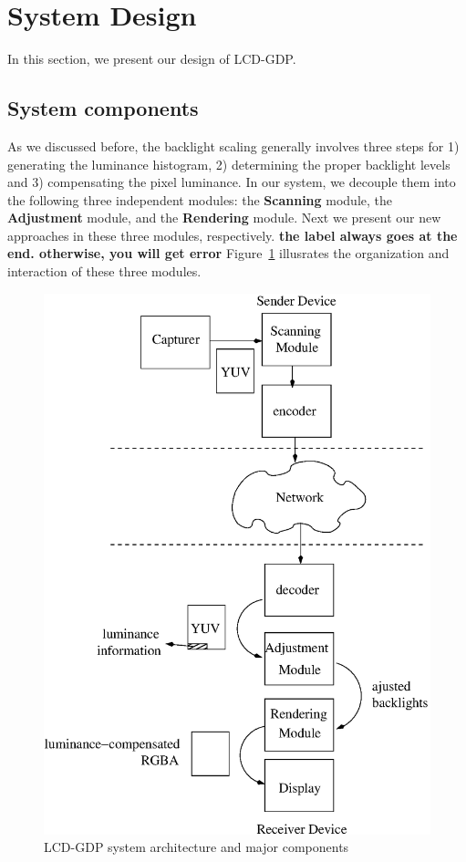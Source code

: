 \section{System Design}
\label{sec:design}
In this section, we present our design of LCD-GDP.

\subsection{System components}
As we discussed before, the backlight scaling  generally
involves three steps for 1) generating the luminance histogram, 2)
determining the proper backlight levels and 3) compensating the
pixel luminance. In our system, we decouple them into the following
three independent modules: the {\bf Scanning} module, the {\bf
 Adjustment} module, and the {\bf Rendering} module. Next we present our
new approaches in these three modules, respectively. 
{\bf the label always goes at the end. otherwise, you will get error}
Figure~\ref{fig:design} illusrates the organization and interaction of these three
modules.

\begin{figure}[t]
  \begin{center}
  \includegraphics[scale=.5]{./figures/design.eps}
  \caption{LCD-GDP system architecture and major components}
\label{fig:design}
  \end{center}
\end{figure}



